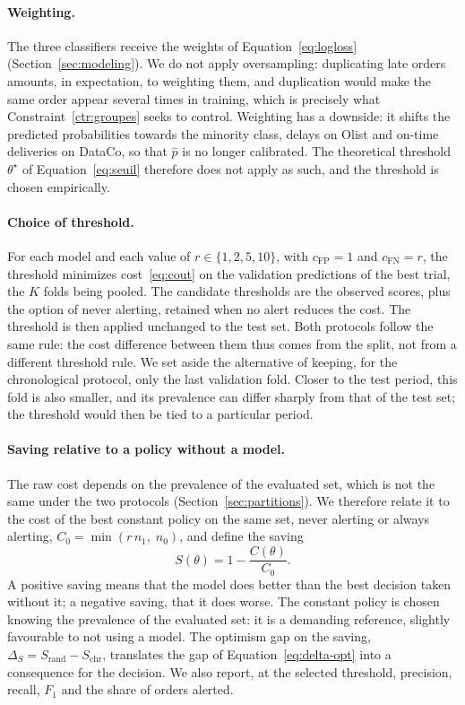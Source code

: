 \documentclass[11pt,a4paper]{article}
\theoremstyle{definition}
\begin{document}
\paragraph{Weighting.} The three classifiers receive the weights of Equation~\eqref{eq:logloss} (Section~\ref{sec:modeling}). We do not apply oversampling: duplicating late orders amounts, in expectation, to weighting them, and duplication would make the same order appear several times in training, which is precisely what Constraint~\ref{ctr:groupes} seeks to control. Weighting has a downside: it shifts the predicted probabilities towards the minority class, delays on Olist and on-time deliveries on DataCo, so that $\hat{p}$ is no longer calibrated. The theoretical threshold $\theta^\star$ of Equation~\eqref{eq:seuil} therefore does not apply as such, and the threshold is chosen empirically.

\paragraph{Choice of threshold.} For each model and each value of $r \in \{1, 2, 5, 10\}$, with $c_{\mathrm{FP}} = 1$ and $c_{\mathrm{FN}} = r$, the threshold minimizes cost~\eqref{eq:cout} on the validation predictions of the best trial, the $K$ folds being pooled. The candidate thresholds are the observed scores, plus the option of never alerting, retained when no alert reduces the cost. The threshold is then applied unchanged to the test set. Both protocols follow the same rule: the cost difference between them thus comes from the split, not from a different threshold rule. We set aside the alternative of keeping, for the chronological protocol, only the last validation fold. Closer to the test period, this fold is also smaller, and its prevalence can differ sharply from that of the test set; the threshold would then be tied to a particular period.

\paragraph{Saving relative to a policy without a model.} The raw cost depends on the prevalence of the evaluated set, which is not the same under the two protocols (Section~\ref{sec:partitions}). We therefore relate it to the cost of the best constant policy on the same set, never alerting or always alerting, $C_0 = \min(r\, n_1,\; n_0)$, and define the saving
\begin{equation}
  S(\theta) = 1 - \frac{C(\theta)}{C_0}.
  \label{eq:economie}
\end{equation}
A positive saving means that the model does better than the best decision taken without it; a negative saving, that it does worse. The constant policy is chosen knowing the prevalence of the evaluated set: it is a demanding reference, slightly favourable to not using a model. The optimism gap on the saving, $\Delta_S = S_{\mathrm{rand}} - S_{\mathrm{chr}}$, translates the gap of Equation~\eqref{eq:delta-opt} into a consequence for the decision. We also report, at the selected threshold, precision, recall, $F_1$ and the share of orders alerted.
\end{document}
